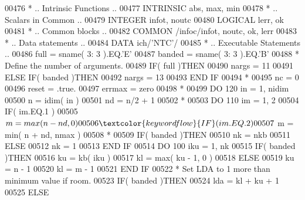 \begin{DoxyCode}
00476 \textcolor{comment}{*     .. Intrinsic Functions ..}
00477       \textcolor{keywordtype}{INTRINSIC}          abs, max, min
00478 \textcolor{comment}{*     .. Scalars in Common ..}
00479       \textcolor{keywordtype}{INTEGER}            infot, noutc
00480       \textcolor{keywordtype}{LOGICAL}            lerr, ok
00481 \textcolor{comment}{*     .. Common blocks ..}
00482       \textcolor{keyword}{COMMON}             /infoc/infot, noutc, ok, lerr
00483 \textcolor{comment}{*     .. Data statements ..}
00484       \textcolor{keyword}{DATA}               ich/\textcolor{stringliteral}{'NTC'}/
00485 \textcolor{comment}{*     .. Executable Statements ..}
00486       full = sname( 3: 3 ).EQ.\textcolor{stringliteral}{'E'}
00487       banded = sname( 3: 3 ).EQ.\textcolor{stringliteral}{'B'}
00488 \textcolor{comment}{*     Define the number of arguments.}
00489       \textcolor{keywordflow}{IF}( full )\textcolor{keywordflow}{THEN}
00490          nargs = 11
00491       \textcolor{keywordflow}{ELSE} \textcolor{keywordflow}{IF}( banded )\textcolor{keywordflow}{THEN}
00492          nargs = 13
00493 \textcolor{keywordflow}{      END IF}
00494 \textcolor{comment}{*}
00495       nc = 0
00496       reset = .true.
00497       errmax = zero
00498 \textcolor{comment}{*}
00499       \textcolor{keywordflow}{DO} 120 in = 1, nidim
00500          n = idim( in )
00501          nd = n/2 + 1
00502 \textcolor{comment}{*}
00503          \textcolor{keywordflow}{DO} 110 im = 1, 2
00504             \textcolor{keywordflow}{IF}( im.EQ.1 )
00505      $         m = max( n - nd, 0 )
00506             \textcolor{keywordflow}{IF}( im.EQ.2 )
00507      $         m = min( n + nd, nmax )
00508 \textcolor{comment}{*}
00509             \textcolor{keywordflow}{IF}( banded )\textcolor{keywordflow}{THEN}
00510                nk = nkb
00511             \textcolor{keywordflow}{ELSE}
00512                nk = 1
00513 \textcolor{keywordflow}{            END IF}
00514             \textcolor{keywordflow}{DO} 100 iku = 1, nk
00515                \textcolor{keywordflow}{IF}( banded )\textcolor{keywordflow}{THEN}
00516                   ku = kb( iku )
00517                   kl = max( ku - 1, 0 )
00518                \textcolor{keywordflow}{ELSE}
00519                   ku = n - 1
00520                   kl = m - 1
00521 \textcolor{keywordflow}{               END IF}
00522 \textcolor{comment}{*              Set LDA to 1 more than minimum value if room.}
00523                \textcolor{keywordflow}{IF}( banded )\textcolor{keywordflow}{THEN}
00524                   lda = kl + ku + 1
00525                \textcolor{keywordflow}{ELSE}

\end{DoxyCode}
